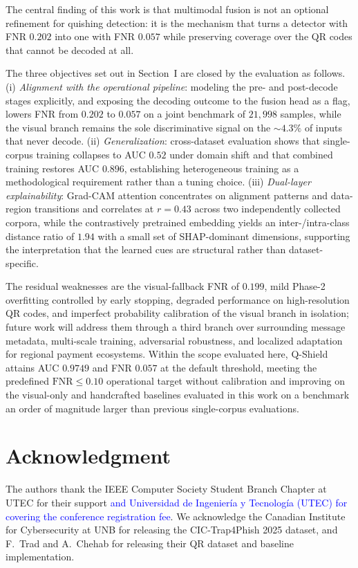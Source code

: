\documentclass[conference]{IEEEtran}
\begin{document}
The central finding of this work is that multimodal fusion is not an optional refinement for quishing detection: it is the mechanism that turns a detector with FNR $0.202$ into one with FNR $0.057$ while preserving coverage over the QR codes that cannot be decoded at all.

The three objectives set out in Section~I are closed by the evaluation as follows. (i) \emph{Alignment with the operational pipeline}: modeling the pre- and post-decode stages explicitly, and exposing the decoding outcome to the fusion head as a flag, lowers FNR from $0.202$ to $0.057$ on a joint benchmark of $21{,}998$ samples, while the visual branch remains the sole discriminative signal on the $\sim$$4.3\%$ of inputs that never decode. (ii) \emph{Generalization}: cross-dataset evaluation shows that single-corpus training collapses to AUC $0.52$ under domain shift and that combined training restores AUC $0.896$, establishing heterogeneous training as a methodological requirement rather than a tuning choice. (iii) \emph{Dual-layer explainability}: Grad-CAM attention concentrates on alignment patterns and data-region transitions and correlates at $r = 0.43$ across two independently collected corpora, while the contrastively pretrained embedding yields an inter-/intra-class distance ratio of $1.94$ with a small set of SHAP-dominant dimensions, supporting the interpretation that the learned cues are structural rather than dataset-specific.

The residual weaknesses are the visual-fallback FNR of $0.199$, mild Phase-2 overfitting controlled by early stopping, degraded performance on high-resolution QR codes, and imperfect probability calibration of the visual branch in isolation; future work will address them through a third branch over surrounding message metadata, multi-scale training, adversarial robustness, and localized adaptation for regional payment ecosystems. Within the scope evaluated here, Q-Shield attains AUC $0.9749$ and FNR $0.057$ at the default threshold, meeting the predefined $\text{FNR} \leq 0.10$ operational target without calibration and improving on the visual-only and handcrafted baselines evaluated in this work on a benchmark an order of magnitude larger than previous single-corpus evaluations.

\section*{Acknowledgment}
\small The authors thank the IEEE Computer Society Student Branch Chapter at UTEC for their support \textcolor{blue}{and Universidad de Ingeniería y Tecnología (UTEC) for covering the conference registration fee}. We acknowledge the Canadian Institute for Cybersecurity at UNB for releasing the CIC-Trap4Phish 2025 dataset, and F.~Trad and A.~Chehab for releasing their QR dataset and baseline implementation.

\balance



\end{document}
